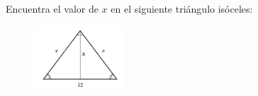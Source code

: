 \question[15] Encuentra el valor de $x$ en el siguiente triángulo isóceles:
\begin{figure}[H]
    \begin{center}
        \includegraphics[width=0.3\textwidth]{../images/pitagoras5.png}
    \end{center}
    \caption{}
    \label{fig:pitagoras5}
\end{figure}